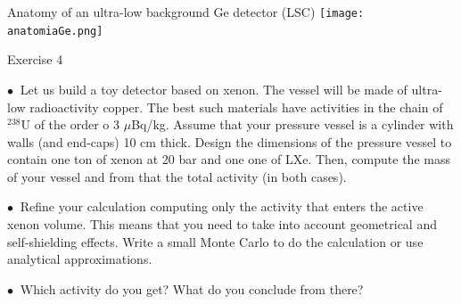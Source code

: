\documentclass [aspectratio=169]{beamer}
\newcommand{\bbonu}{\ensuremath{\beta\beta0\nu}}
\newcommand{\qbb}{\ensuremath{Q_{\beta\beta}}}
\newcommand{\XE}{\ensuremath{{}^{136}{\rm Xe}}}
\begin{document}
\begin{frame}{Anatomy of an ultra-low background Ge detector (LSC)}
\texttt{[image: anatomiaGe.png]}

%
% 
%
\end{frame}



\begin{frame}{Exercise 4}

$\bullet~$ Let us build a toy detector based on xenon. The vessel will be made of ultra-low radioactivity copper. The best such materials have activities in the chain of
${}^{238}$U of the order o 3 $\mu$Bq/kg. Assume that your pressure vessel is a cylinder with walls (and end-caps) 10 cm thick. Design the dimensions of the pressure vessel to contain one ton of xenon at 20 bar and one one of LXe. Then, compute the mass of your vessel and from that the total activity (in both cases). 

$\bullet~$ Refine your calculation computing only the activity that enters the active xenon volume. This means that you need to take into account geometrical and self-shielding effects. Write a small Monte Carlo to do the calculation or use analytical approximations.

$\bullet~$ Which activity do you get? What do you conclude from there?
\end{frame}

%
%
\end{document}
